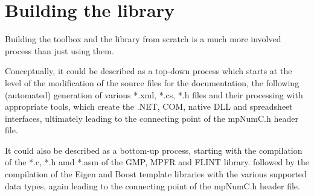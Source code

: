 %	
%	
%	
%	
%
%	
%	
%	
%	
%	
%	
%	
%	
%	
%	
%	
%	
%	
%	
%	
%	
%	
%	
%	
%	
	




\chapter{Building the library} 

Building the toolbox and the library from scratch is a much more involved process than just using them. 

Conceptually, it could be described as a top-down process which starts at the level of the modification of the source files for the documentation, the following (automated) generation of various *.xml, *.cs, *.h files and their processing with appropriate tools, which create the .NET, COM, native DLL and spreadsheet interfaces, ultimately leading to the connecting point of the mpNumC.h header file.

It could also be described as a bottom-up process, starting with the compilation of the *.c, *.h amd *.asm of the GMP, MPFR and FLINT library. followed by the compilation of the Eigen and Boost template libraries with the various supported data types, again leading  to the connecting point of the mpNumC.h header file.

